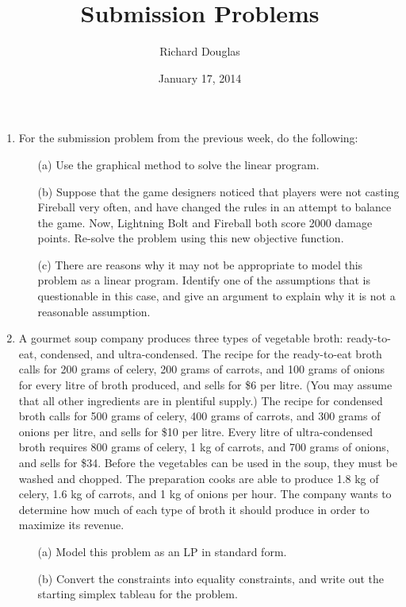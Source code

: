 \documentclass{article}[12pt,a4paper]
\title{Submission Problems}
\author{Richard Douglas}
\date{January 17,  2014}
\begin{document}
  \maketitle
  
  \begin{enumerate}
  \item For the submission problem from the previous week, do the following:
  
  \begin{enumerate}
  \item[(a)]  Use the graphical method to solve the linear program.
  \item[(b)] Suppose that the game designers noticed that players were not casting Fireball
  very often, and have changed the rules in an attempt to balance the game. Now,
  Lightning Bolt and Fireball both score 2000 damage points. Re-solve the problem
  using this new objective function.
  \item[(c)] There are reasons why it may not be appropriate to model this problem as a linear
  program. Identify one of the assumptions that is questionable in this case, and give
  an argument to explain why it is not a reasonable assumption.
  \end{enumerate}
  
  \item A gourmet soup company produces three types of vegetable broth: ready-to-eat, condensed,
  and ultra-condensed. The recipe for the ready-to-eat broth calls for 200 grams of celery, 200
  grams of carrots, and 100 grams of onions for every litre of broth produced, and sells for \$6
  per litre. (You may assume that all other ingredients are in plentiful supply.) The recipe for
  condensed broth calls for 500 grams of celery, 400 grams of carrots, and 300 grams of onions
  per litre, and sells for \$10 per litre. Every litre of ultra-condensed broth requires 800 grams
  of celery, 1 kg of carrots, and 700 grams of onions, and sells for \$34. Before the vegetables
  can be used in the soup, they must be washed and chopped. The preparation cooks are able
  to produce 1.8 kg of celery, 1.6 kg of carrots, and 1 kg of onions per hour. The company
  wants to determine how much of each type of broth it should produce in order to maximize
  its revenue.
  
  \begin{enumerate}
  \item[(a)] Model this problem as an LP in standard form.
  \item[(b)] Convert the constraints into equality constraints, and write out the starting simplex
  tableau for the problem.
  \end{enumerate}
  

\end{enumerate}
\end{document}
